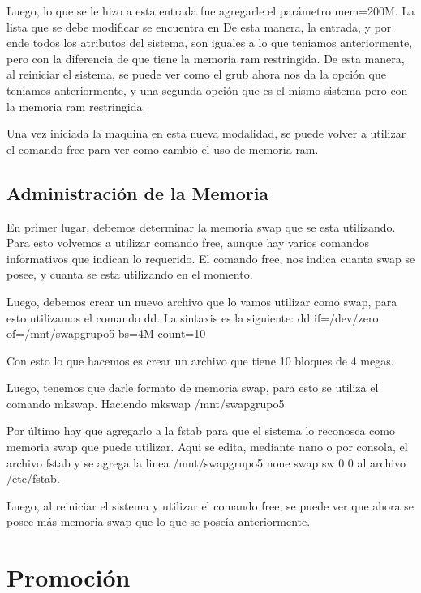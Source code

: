 \documentclass[a4paper, 12pt]{article}
\begin{document}
Luego, lo que se le hizo a esta entrada fue agregarle el par\'ametro mem=200M. La lista que se debe modificar se encuentra en  De esta manera, la entrada, y por ende todos los atributos del sistema, son iguales a lo que teniamos anteriormente, pero con la diferencia de que tiene la memoria ram restringida. De esta manera, al reiniciar el sistema, se puede ver como el grub ahora nos da la opci\'on que teniamos anteriormente, y una segunda opci\'on que es el mismo sistema pero con la memoria ram restringida. 

Una vez iniciada la maquina en esta nueva modalidad, se puede volver a utilizar el comando free para ver como cambio el uso de memoria ram.

\subsection*{Administraci\'on de la Memoria}

En primer lugar, debemos determinar la memoria swap que se esta utilizando. Para esto volvemos a utilizar comando free, aunque hay varios comandos informativos que indican lo requerido. El comando free, nos indica cuanta swap se posee, y cuanta se esta utilizando en el momento.

Luego, debemos crear un nuevo archivo que lo vamos utilizar como swap, para esto utilizamos el comando dd. La sintaxis es la siguiente: dd if=/dev/zero of=/mnt/swapgrupo5 bs=4M count=10

Con esto lo que hacemos es crear un archivo que tiene 10 bloques de 4 megas. 

Luego, tenemos que darle formato de memoria swap, para esto se utiliza el comando mkswap. Haciendo mkswap /mnt/swapgrupo5


Por \'ultimo hay que agregarlo a la fstab para que el sistema lo reconosca como memoria swap que puede utilizar. Aqui se edita, mediante nano o por consola, el archivo fstab y se agrega la linea /mnt/swapgrupo5 none swap sw 0 0 al archivo /etc/fstab.


Luego, al reiniciar el sistema y utilizar el comando free, se puede ver que ahora se posee m\'as memoria swap que lo que se pose\'ia anteriormente. 



\section*{Promoci\'on}
\end{document}
